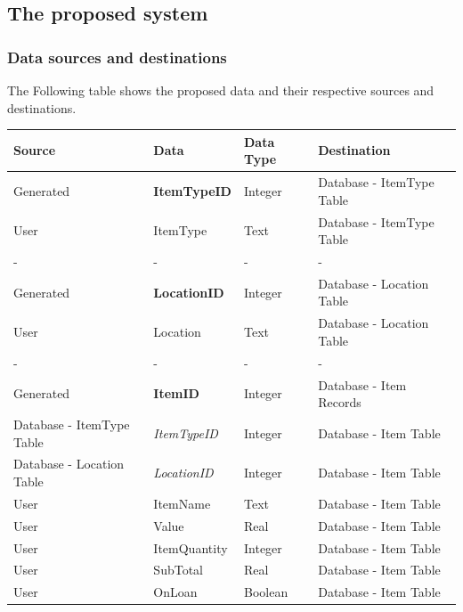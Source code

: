 \subsection{The proposed system}

\subsubsection{Data sources and destinations}

The Following table shows the proposed data and their respective sources and destinations.

\begin{center}
        \begin{tabular}{|p{2cm}|p{3cm}|p{3cm}|p{3cm}|}
            \hline
            \textbf{Source} & \textbf{Data} & \textbf{Data Type} & \textbf{Destination} \\ \hline
            Generated & \textbf{ItemTypeID} & Integer & Database - ItemType Table \\ \hline
            User & ItemType & Text & Database - ItemType Table \\ \hline
            - & - & - & - \\ \hline
            Generated & \textbf{LocationID} & Integer & Database - Location Table \\ \hline
            User & Location & Text & Database - Location Table \\ \hline
            - & - & - & - \\ \hline
            Generated & \textbf{ItemID} & Integer & Database - Item Records \\ \hline
            Database - ItemType Table & \emph{ItemTypeID} & Integer & Database - Item Table \\ \hline
            Database - Location Table & \emph{LocationID} & Integer & Database - Item Table \\ \hline
            User & ItemName & Text & Database - Item Table \\ \hline
            User & Value & Real & Database - Item Table \\ \hline
            User & ItemQuantity & Integer & Database - Item Table \\ \hline
            User & SubTotal & Real & Database - Item Table \\ \hline
            User & OnLoan & Boolean & Database - Item Table \\ \hline
            \end{tabular}
\end{center}

